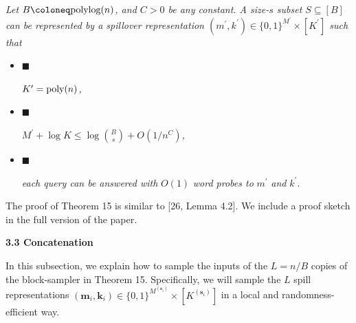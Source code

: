 \emph{Let $B\coloneq\textnormal{polylog}(n)$, and $C>0$ be any constant.
A size-$s$ subset $S\subseteq[B]$ can be represented by a spillover representation $(m^{\prime},k^{\prime})\in\{0,1\}^{M^{\prime}}\times[K^{\prime}]$ such that}\par


\begin{itemize}


\item[] 
$\blacksquare$ 


$K^{\prime}=\textnormal{poly}(n)$\emph{,}\par





\item[] 
$\blacksquare$ 


$M^{\prime}+\log K\leq\log\binom{B}{s}+O(1/n^{C})$\emph{,}\par





\item[] 
$\blacksquare$ 


\emph{each query can be answered with }$O(1)$\emph{ word probes to }$m^{\prime}$\emph{ and }$k^{\prime}$\emph{.}\par





\end{itemize}






The proof of Theorem 15 is similar to [26, Lemma 4.2].
We include a proof sketch in the full version of the paper.\par





\par\medskip\noindent\textbf{
3.3 Concatenation}\par




In this subsection, we explain how to sample the inputs of the $L=n/B$ copies of the block-sampler in Theorem 15.
Specifically, we will sample the $L$ spill representations $(\boldsymbol{m}_{i},\boldsymbol{k}_{i})\in\{0,1\}^{M^{(\boldsymbol{s}_{i})}}\times[K^{(\boldsymbol{s}_{i})}]$ in a local and randomness-efficient way.\par




